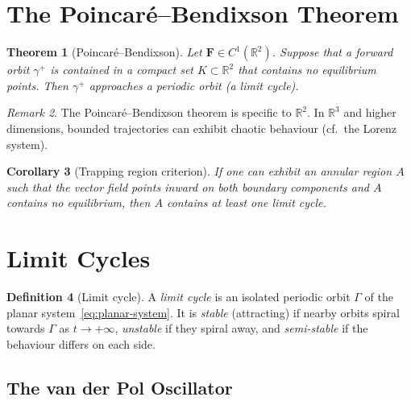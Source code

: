 \documentclass[12pt,a4paper,openany]{book}
\theoremstyle{definition}
\newtheorem{definition}{Definition}[chapter]
\theoremstyle{plain}
\newtheorem{theorem}[definition]{Theorem}
\newtheorem{corollary}[definition]{Corollary}
\theoremstyle{remark}
\newtheorem{remark}[definition]{Remark}
\newcommand{\R}{\mathbb{R}}
\begin{document}
\section{The Poincar\'e--Bendixson Theorem}
\label{sec:poincare-bendixson}

\begin{theorem}[Poincar\'e--Bendixson]
\label{thm:poincare-bendixson}
Let $\mathbf{F}\in C^{1}(\R^{2})$. Suppose that a forward orbit
$\gamma^{+}$ is contained in a compact set $K\subset\R^{2}$ that
contains no equilibrium points. Then $\gamma^{+}$ approaches a
periodic orbit (a \emph{limit cycle}).
\end{theorem}

\begin{remark}
\label{rem:pb-dimension}
The Poincar\'e--Bendixson theorem is specific to $\R^{2}$.
In $\R^{3}$ and higher dimensions, bounded trajectories can exhibit
chaotic behaviour (cf.\ the Lorenz system).
\end{remark}

\begin{corollary}[Trapping region criterion]
\label{cor:trapping-region}
If one can exhibit an annular region $A$ such that the vector field
points inward on both boundary components and $A$ contains no
equilibrium, then $A$ contains at least one limit cycle.
\end{corollary}

\section{Limit Cycles}
\label{sec:limit-cycles}

\begin{definition}[Limit cycle]
\label{def:limit-cycle}
A \emph{limit cycle} is an isolated periodic orbit $\Gamma$ of the
planar system~\eqref{eq:planar-system}. It is \emph{stable}
(attracting) if nearby orbits spiral towards $\Gamma$ as
$t\to+\infty$, \emph{unstable} if they spiral away, and
\emph{semi-stable} if the behaviour differs on each side.
\end{definition}

\subsection{The van der Pol Oscillator}
\label{subsec:van-der-pol}
\end{document}
